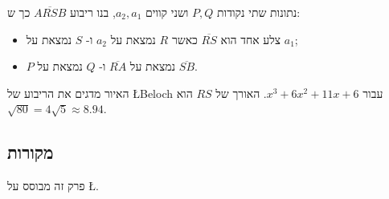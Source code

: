 נתונות שתי נקודות
$P,Q$
ושני קווים
$a_2,a_1$,
בנו ריבוע
$\overline{ARSB}$
כך ש:
\begin{itemize}
\item 
צלע אחד הוא
$\overline{RS}$
כאשר
$R$
נמצאת על
$a_2$
ו-%
$S$
נמצאת על
$a_1$;
\item $P$
נמצאת על
$\overline{RA}$
ו-%
$Q$
נמצאת על
$\overline{SB}$.
\end{itemize}
האיור
מדגים את הריבוע של
\L{Beloch}
עבור 
$x^3+6x^2+11x+6$.
האורך של
$RS$
הוא
$\sqrt{80}=4\sqrt{5}\approx 8.94$. 

\subsection*{מקורות}

פרק זה מבוסס על
\L{\cite{bradford, hull-beloch, riaz}}.
